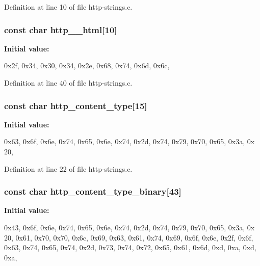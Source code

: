 Definition at line 10 of file http-\/strings.c.

\hypertarget{http-strings_8c_ae31e183cd9f67c1ec51663c38180b8ee}{
\subsubsection[{http\_\-404\_\-html}]{\setlength{\rightskip}{0pt plus 5cm}const char {\bf http\_\_\-html}\mbox{[}10\mbox{]}}}
\label{http-strings_8c_ae31e183cd9f67c1ec51663c38180b8ee}
{\bfseries Initial value:}
\begin{DoxyCode}
 

{0x2f, 0x34, 0x30, 0x34, 0x2e, 0x68, 0x74, 0x6d, 0x6c, }
\end{DoxyCode}


Definition at line 40 of file http-\/strings.c.

\hypertarget{http-strings_8c_a1efed1f3f714de7d7748f67613286228}{
\subsubsection[{http\_\-content\_\-type}]{\setlength{\rightskip}{0pt plus 5cm}const char {\bf http\_\-content\_\-type}\mbox{[}15\mbox{]}}}
\label{http-strings_8c_a1efed1f3f714de7d7748f67613286228}
{\bfseries Initial value:}
\begin{DoxyCode}
 

{0x63, 0x6f, 0x6e, 0x74, 0x65, 0x6e, 0x74, 0x2d, 0x74, 0x79, 0x70, 0x65, 0x3a, 0x
      20, }
\end{DoxyCode}


Definition at line 22 of file http-\/strings.c.

\hypertarget{http-strings_8c_a2ce17b5a8d67c7d96121463bf239ea68}{
\subsubsection[{http\_\-content\_\-type\_\-binary}]{\setlength{\rightskip}{0pt plus 5cm}const char {\bf http\_\-content\_\-type\_\-binary}\mbox{[}43\mbox{]}}}
\label{http-strings_8c_a2ce17b5a8d67c7d96121463bf239ea68}
{\bfseries Initial value:}
\begin{DoxyCode}
 

{0x43, 0x6f, 0x6e, 0x74, 0x65, 0x6e, 0x74, 0x2d, 0x74, 0x79, 0x70, 0x65, 0x3a, 0x
      20, 0x61, 0x70, 0x70, 0x6c, 0x69, 0x63, 0x61, 0x74, 0x69, 0x6f, 0x6e, 0x2f, 0x6f,
       0x63, 0x74, 0x65, 0x74, 0x2d, 0x73, 0x74, 0x72, 0x65, 0x61, 0x6d, 0xd, 0xa, 0xd,
       0xa, }
\end{DoxyCode}


